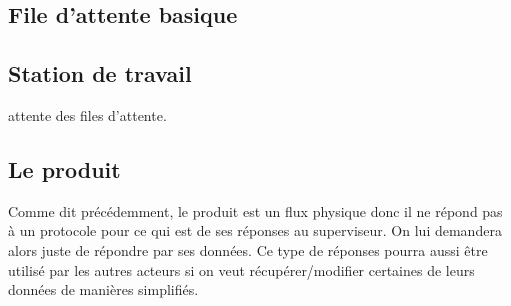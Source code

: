 \documentclass[12pt,a4paper]{article}
\begin{document}
		\subsection{File d'attente basique}

		\subsection{Station de travail}
			attente des files d'attente. 
		 
		\subsection{Le produit}
			 Comme dit précédemment, le produit est un flux physique donc il 
			 ne répond pas à un protocole pour ce qui est de ses réponses au 
			 superviseur. On lui demandera alors juste de répondre par ses données. 
			 Ce type de réponses pourra aussi être utilisé par les autres acteurs 
			 si on veut récupérer/modifier certaines de leurs données de 
			 manières simplifiés.
\end{document}
